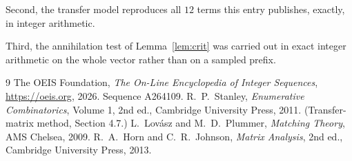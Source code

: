 \documentclass[11pt,a4paper]{article}
\theoremstyle{plain}
\theoremstyle{definition}
\begin{document}
Second, the transfer model reproduces all $12$ terms this entry publishes, exactly, in
integer arithmetic.

Third, the annihilation test of Lemma~\ref{lem:crit} was carried out in exact integer
arithmetic on the whole vector rather than on a sampled prefix.

\begin{thebibliography}{9}
 The OEIS Foundation, \emph{The On-Line Encyclopedia of Integer
Sequences}, \url{https://oeis.org}, 2026. Sequence A264109.
 R.~P.~Stanley, \emph{Enumerative Combinatorics}, Volume 1, 2nd ed.,
Cambridge University Press, 2011. (Transfer-matrix method, Section 4.7.)
 L.~Lov\'asz and M.~D.~Plummer, \emph{Matching Theory}, AMS Chelsea, 2009.
 R.~A.~Horn and C.~R.~Johnson, \emph{Matrix Analysis}, 2nd ed., Cambridge
University Press, 2013.
\end{thebibliography}
\end{document}
